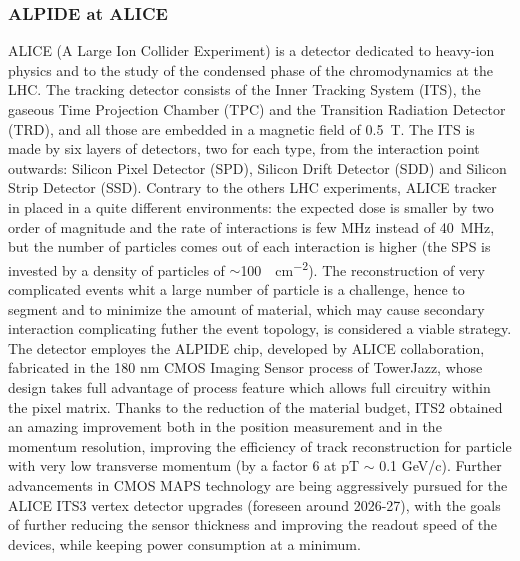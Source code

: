        \subsubsection{ALPIDE at ALICE}
        ALICE (A Large Ion Collider Experiment) is a detector dedicated to heavy-ion physics and to the study of the condensed phase of the chromodynamics at the LHC.
        The tracking detector consists of the Inner Tracking System (ITS), the gaseous Time Projection Chamber (TPC) and the Transition Radiation Detector (TRD),  and all those are embedded in a magnetic field of \SI{0.5}{T}. The ITS is made by six layers of detectors, two for each type, from the interaction point outwards: Silicon Pixel Detector (SPD), Silicon Drift Detector (SDD) and Silicon Strip Detector (SSD).         
        Contrary to the others LHC experiments, ALICE tracker in placed in a quite different environments: the expected dose is smaller by two order of magnitude and the rate of interactions is few \si{MHz} instead of \SI{40}{MHz}, but the number of particles comes out of each interaction is higher (the SPS is invested by a density of particles of $\sim$\SI{100}{\per cm\tothe{-2}}).  
        The reconstruction of very complicated events whit a large number of particle is a challenge, hence to segment and to minimize the amount of material, which may cause secondary interaction complicating futher the event topology, is considered a viable strategy. 
        The detector employes the ALPIDE chip, developed by ALICE collaboration, fabricated in the 180 nm CMOS Imaging Sensor process of TowerJazz, whose design takes full advantage of process feature which allows full circuitry within the pixel matrix.
        Thanks to the reduction of the material budget, ITS2 obtained an amazing improvement both in the position measurement and in the momentum resolution, improving the efficiency of track reconstruction for particle with very low transverse momentum (by a factor 6 at pT $\sim$ 0.1 GeV/c). Further advancements in CMOS MAPS technology are being aggressively pursued for the ALICE ITS3 vertex detector upgrades (foreseen around 2026-27), with the goals of further reducing the sensor thickness and improving the readout speed of the devices, while keeping power consumption at a minimum.

